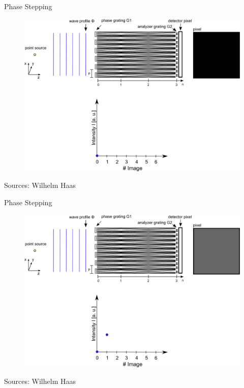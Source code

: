 \begin{frame}{Phase Stepping}
    \vspace{-0.5cm}
    \begin{figure}
        \includegraphics[height=0.92\textheight]{images/phase1.eps}
    \end{figure}
    \begin{flushright}
        \scriptsize Sources: Wilhelm Haas
    \end{flushright}
\end{frame}

\begin{frame}{Phase Stepping}
    \vspace{-0.5cm}
    \begin{figure}
        \includegraphics[height=0.92\textheight]{images/phase2.eps}
    \end{figure}
    \begin{flushright}
        \scriptsize Sources: Wilhelm Haas
    \end{flushright}
\end{frame}


